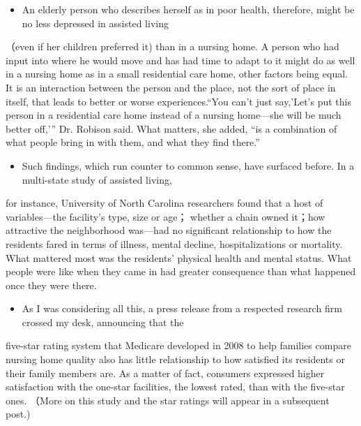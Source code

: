 \documentclass[UTF8,11pt]{ctexart}
\begin{document}
\begin{itemize}[leftmargin=2em,itemsep=.2em,topsep=.4em]\item[H.] An elderly person who describes herself as in poor health, therefore, might be no less depressed in assisted living
\end{itemize}

（even if her children preferred it) than in a nursing home. A person who had input into where he would move and has had time to adapt to it might do as well in a nursing home as in a small residential care home, other factors being equal. It is an interaction between the person and the place, not the sort of place in itself, that leads to better or worse experiences.“You can't just say,'Let's put this person in a residential care home instead of a nursing home—she will be much better off,'” Dr. Robison said. What matters, she added, “is a combination of what people bring in with them, and what they find there.”


\begin{itemize}[leftmargin=2em,itemsep=.2em,topsep=.4em]\item[I.] Such findings, which run counter to common sense, have surfaced before. In a multi-state study of assisted living,
\end{itemize}

for instance, University of North Carolina researchers found that a host of variables—the facility's type, size or age； whether a chain owned it；how attractive the neighborhood was—had no significant relationship to how the residents fared in terms of illness, mental decline, hospitalizations or mortality. What mattered most was the residents' physical health and mental status. What people were like when they came in had greater consequence than what happened once they were there.


\begin{itemize}[leftmargin=2em,itemsep=.2em,topsep=.4em]\item[J.] As I was considering all this, a press release from a respected research firm crossed my desk, announcing that the
\end{itemize}

five-star rating system that Medicare developed in 2008 to help families compare nursing home quality also has little relationship to how satisfied its residents or their family members are. As a matter of fact, consumers expressed higher satisfaction with the one-star facilities, the lowest rated, than with the five-star ones. （More on this study and the star ratings will appear in a subsequent post.)
\end{document}
